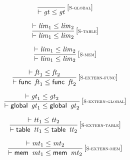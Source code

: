 $$
\begin{array}{@{}c@{}}\displaystyle
\frac{
}{
{ \vdash }\;{\mathit{gt}} \leq {\mathit{gt}}
} \, {[\textsc{\scriptsize S{-}global}]}
\qquad
\end{array}
$$

$$
\begin{array}{@{}c@{}}\displaystyle
\frac{
{ \vdash }\;{\mathit{lim}}_{{1}} \leq {\mathit{lim}}_{{2}}
}{
{ \vdash }\;{\mathit{lim}}_{{1}} \leq {\mathit{lim}}_{{2}}
} \, {[\textsc{\scriptsize S{-}table}]}
\qquad
\end{array}
$$

$$
\begin{array}{@{}c@{}}\displaystyle
\frac{
{ \vdash }\;{\mathit{lim}}_{{1}} \leq {\mathit{lim}}_{{2}}
}{
{ \vdash }\;{\mathit{lim}}_{{1}} \leq {\mathit{lim}}_{{2}}
} \, {[\textsc{\scriptsize S{-}mem}]}
\qquad
\end{array}
$$

\vspace{1ex}

$$
\begin{array}{@{}c@{}}\displaystyle
\frac{
{ \vdash }\;{\mathit{ft}}_{{1}} \leq {\mathit{ft}}_{{2}}
}{
{ \vdash }\;\mathsf{func}~\,{\mathit{ft}}_{{1}} \leq \mathsf{func}~\,{\mathit{ft}}_{{2}}
} \, {[\textsc{\scriptsize S{-}extern{-}func}]}
\qquad
\end{array}
$$

$$
\begin{array}{@{}c@{}}\displaystyle
\frac{
{ \vdash }\;{\mathit{gt}}_{{1}} \leq {\mathit{gt}}_{{2}}
}{
{ \vdash }\;\mathsf{global}~\,{\mathit{gt}}_{{1}} \leq \mathsf{global}~\,{\mathit{gt}}_{{2}}
} \, {[\textsc{\scriptsize S{-}extern{-}global}]}
\qquad
\end{array}
$$

$$
\begin{array}{@{}c@{}}\displaystyle
\frac{
{ \vdash }\;{\mathit{tt}}_{{1}} \leq {\mathit{tt}}_{{2}}
}{
{ \vdash }\;\mathsf{table}~\,{\mathit{tt}}_{{1}} \leq \mathsf{table}~\,{\mathit{tt}}_{{2}}
} \, {[\textsc{\scriptsize S{-}extern{-}table}]}
\qquad
\end{array}
$$

$$
\begin{array}{@{}c@{}}\displaystyle
\frac{
{ \vdash }\;{\mathit{mt}}_{{1}} \leq {\mathit{mt}}_{{2}}
}{
{ \vdash }\;\mathsf{mem}~\,{\mathit{mt}}_{{1}} \leq \mathsf{mem}~\,{\mathit{mt}}_{{2}}
} \, {[\textsc{\scriptsize S{-}extern{-}mem}]}
\qquad
\end{array}
$$

